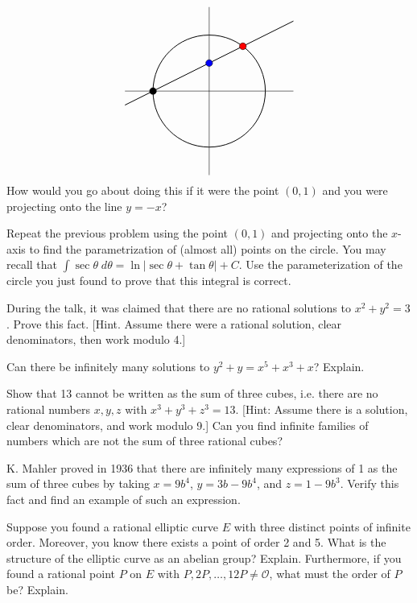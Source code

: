 \documentclass[11pt,letterpaper]{article}
\begin{document}
	\[
	\begin{tikzpicture}[scale=1.75]
	\draw (-1.5,0) -- (1.5,0);
	\draw (0,-1.5) -- (0,1.5);

	\draw[line width=0.7] (-1.5,-0.25) -- (1.5,1.25);
	\draw[line width=0.7] (0,0) circle (1);
	
	\draw[fill=black] (-1,0) circle (0.06);
	\draw[fill=blue] (0,0.5) circle (0.06);
	\draw[fill=red] (0.6,0.8) circle (0.06);
	\end{tikzpicture}
	\] 
How would you go about doing this if it were the point $(0, 1)$ and you were projecting onto the line $y= -x$? \pspace

\problem Repeat the previous problem using the point $(0, 1)$ and projecting onto the $x$-axis to find the parametrization of (almost all) points on the circle. You may recall that $\displaystyle \int \sec \theta \;d\theta= \ln|\sec \theta + \tan \theta| + C$. Use the parameterization of the circle you just found to prove that this integral is correct. \pspace

\problem During the talk, it was claimed that there are no rational solutions to $x^2 + y^2= 3$. Prove this fact. [Hint. Assume there were a rational solution, clear denominators, then work modulo 4.] \pspace

\problem Can there be infinitely many solutions to $y^2 + y= x^5 + x^3 + x$? Explain. \pspace

\problem Show that 13 cannot be written as the sum of three cubes, i.e. there are no rational numbers $x, y, z$ with $x^3 + y^3 + z^3= 13$. [Hint: Assume there is a solution, clear denominators, and work modulo 9.] Can you find infinite families of numbers which are not the sum of three rational cubes? \pspace

\problem K. Mahler proved in 1936 that there are infinitely many expressions of 1 as the sum of three cubes by taking $x= 9b^4$, $y= 3b - 9b^4$, and $z= 1 - 9b^3$. Verify this fact and find an example of such an expression. \pspace

\problem Suppose you found a rational elliptic curve $E$ with three distinct points of infinite order. Moreover, you know there exists a point of order 2 and 5. What is the structure of the elliptic curve as an abelian group? Explain. Furthermore, if you found a rational point $P$ on $E$ with $P, 2P, \ldots, 12P \neq \mathcal{O}$, what must the order of $P$ be? Explain.
\end{document}
